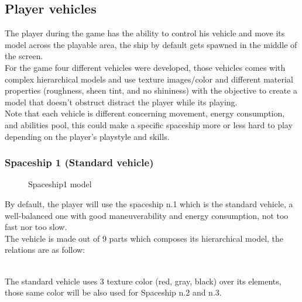 \documentclass[a4paper,11pt]{article}
\begin{document}
\subsection{Player vehicles}

The player during the game has the ability to control his vehicle and move its model across the playable area, the ship by default gets spawned in the middle of the screen.\\
For the game four different vehicles were developed, those vehicles comes with complex hierarchical models and use texture images/color and different material properties (roughness, sheen tint, and no shininess) with the objective to create a model that doesn't obstruct distract the player while its playing.\\
Note that each vehicle is different concerning movement, energy consumption, and abilities pool, this could make a specific spaceship more or less hard to play depending on the player's playstyle and skills.
\subsubsection{Spaceship 1 (Standard vehicle)}
\begin{figure}[H]%
    \centering
    \qquad
    \caption{Spaceship1 model}%
\end{figure}

By default, the player will use the spaceship n.1 which is the standard vehicle, a well-balanced one with good maneuverability and energy consumption, not too fast nor too slow.\\
The vehicle is made out of 9 parts which composes its hierarchical model, the relations are as follow:\\
\begin{minipage}{0.9\textwidth}
\end{minipage}\\
The standard vehicle uses 3 texture color (red, gray, black) over its elements, those same color will be also used for Spaceship n.2 and n.3.
\end{document}
